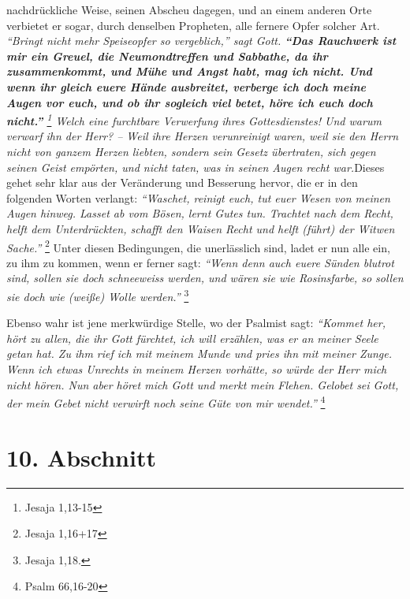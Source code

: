 nachdrückliche Weise, seinen Abscheu dagegen, und an einem anderen Orte
verbietet
er sogar, durch denselben Propheten, alle fernere Opfer solcher Art.
\textit{\textit{"`Bringt nicht mehr Speiseopfer so vergeblich,"'} sagt Gott.
\label{ref:06_09_gebetserhoerung}
\textbf{"`Das Rauchwerk ist mir ein Greuel, die Neumondtreffen und Sabbathe, da
ihr
zusammenkommt, und Mühe und Angst habt, mag ich nicht. Und wenn ihr gleich euere
Hände ausbreitet, verberge ich doch meine Augen vor euch, und ob ihr sogleich
viel
betet, höre ich euch doch nicht."'} 
\footnote{Jesaja 1,13-15}
Welch eine
furchtbare Verwerfung ihres Gottesdienstes! Und warum verwarf ihn der Herr? --
Weil ihre Herzen verunreinigt waren, weil sie den Herrn nicht von ganzem Herzen
liebten, sondern sein Gesetz übertraten, sich gegen seinen Geist empörten, und
nicht taten, was in seinen Augen recht war.}Dieses gehet sehr klar aus der
Veränderung und Besserung hervor, die er in den folgenden Worten verlangt:
\textit{"`Waschet, reinigt euch, tut euer Wesen von meinen Augen hinweg. Lasset
ab vom
Bösen, lernt Gutes tun. Trachtet nach dem Recht, helft dem Unterdrückten,
schafft den Waisen Recht und helft (führt) der Witwen Sache."'}
\footnote{Jesaja 1,16+17}
Unter diesen Bedingungen, die unerlässlich sind, ladet er nun alle ein,
zu ihm zu kommen, wenn er ferner sagt:
\textit{"`Wenn denn auch euere Sünden blutrot
sind, sollen sie doch schneeweiss werden, und wären sie wie Rosinsfarbe, so
sollen sie doch wie (weiße) Wolle werden."'}
\footnote{Jesaja 1,18.}

\medskip

Ebenso wahr ist jene merkwürdige Stelle, wo der Psalmist sagt:
\textit{"`Kommet her,
hört zu allen, die ihr Gott fürchtet, ich will erzählen, was er an meiner Seele
getan hat. Zu ihm rief ich mit meinem Munde und pries ihn mit meiner Zunge.
Wenn ich etwas Unrechts in meinem Herzen vorhätte, so würde der Herr mich nicht
hören. Nun aber höret mich Gott und merkt mein Flehen. Gelobet sei Gott,
der mein Gebet nicht verwirft noch seine Güte von mir wendet."'}
\footnote{Psalm 66,16-20}

\section{10. Abschnitt} \label{kap6_ab10}

